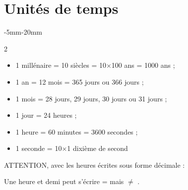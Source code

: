 \section{Unités de temps}
   \begin{changemargin}{-5mm}{-20mm}
        \begin{myvocabulaire}
            \begin{multicols}{2}
                \begin{itemize}
                \item 1 millénaire = 10 siècles = 10$\times$100 ans = \num{1000} ans ; 
                \item 1 an = 12 mois = 365 jours ou 366 jours ;
                \item 1 mois =  28 jours, 29 jours, 30 jours ou 31 jours ;
                \item 1 jour = 24 heures ;
                \item 1 heure = 60 minutes = \num{3600} secondes ;
                \item 1 seconde = 10$\times$1 dixième de second
                \end{itemize}
            \end{multicols}
        \end{myvocabulaire}
    \end{changemargin}
    \vspace*{-10mm}
    \begin{remarque}
        ATTENTION, avec les heures écrites sous forme décimale : 
        
        Une heure et demi  peut s'écrire  =  mais  $\neq$ .
    \end{remarque}
    \vspace*{-10mm}